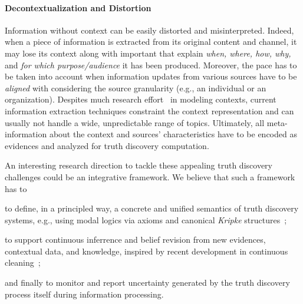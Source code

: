 \documentclass[prodmode,acmtecs]{acmsmall} %
\begin{document}
\paragraph*{Decontextualization and Distortion}  
Information without context can be easily distorted and misinterpreted.
Indeed, when a piece of information is extracted from its original 
content and channel, it may lose its context along with important 
 that explain \emph{when, where, how, why,} and
\emph{for which purpose/audience} it has been produced.
Moreover, the pace has to be taken into account when information updates from 
various sources have to be \emph{aligned} with considering the source granularity 
(e.g., an individual or an organization). 
Despites much research effort~\cite{eps270829} in modeling contexts, current information
extraction techniques constraint the 
context representation and can usually not handle a wide, unpredictable range of topics. Ultimately,
all meta-information about the context and sources' 
characteristics have to be encoded as evidences and analyzed for truth discovery computation.

\iffalse
Besides challenges given above, \emph{cross-modal} and \emph{dynamic} truth discovery
are also in their infancy. Cross-modality is needed because of the multiple possible facets,
e.g., textual, pictures, and movies, of the same information that need to be reconcilied.
Dynamicity is due by the fact recieved information could be subjet to multiple transformations
through the transmission media or intermediate applications during its life cycle. We believe that directions
for tacking these appealing truth discovery problems could be 
\fi

An interesting research direction to tackle these appealing truth discovery challenges could be an integrative
framework. We believe that such a framework has to
\begin{inparaenum}[(i)]
\item to define, in a principled way, a concrete and unified semantics of truth discovery systems, e.g., using
modal logics via axioms and canonical 
\emph{Kripke} structures~\cite{GorankoOtto06};
\item to support continuous inferrence and belief revision from new evidences, contextual data, and knowledge, inspired by recent development
in continuous cleaning~\cite{VCSM14};
\item and finally to monitor and report uncertainty generated by the truth discovery process itself during information processing.
\end{inparaenum}
\end{document}
